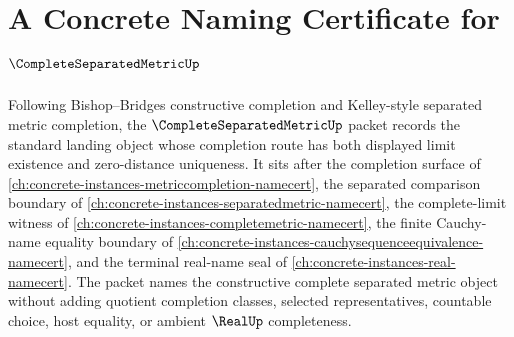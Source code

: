 \chapter{A Concrete Naming Certificate for $\CompleteSeparatedMetricUp$}
\label{ch:concrete-instances-complete-separated-metric-namecert}

Following Bishop--Bridges constructive completion and Kelley-style separated metric completion, the $\CompleteSeparatedMetricUp$ packet records the standard landing object whose completion route has both displayed limit existence and zero-distance uniqueness. It sits after the completion surface of \autoref{ch:concrete-instances-metriccompletion-namecert}, the separated comparison boundary of \autoref{ch:concrete-instances-separatedmetric-namecert}, the complete-limit witness of \autoref{ch:concrete-instances-completemetric-namecert}, the finite Cauchy-name equality boundary of \autoref{ch:concrete-instances-cauchysequenceequivalence-namecert}, and the terminal real-name seal of \autoref{ch:concrete-instances-real-namecert}. The packet names the constructive complete separated metric object without adding quotient completion classes, selected representatives, countable choice, host equality, or ambient $\RealUp$ completeness.

